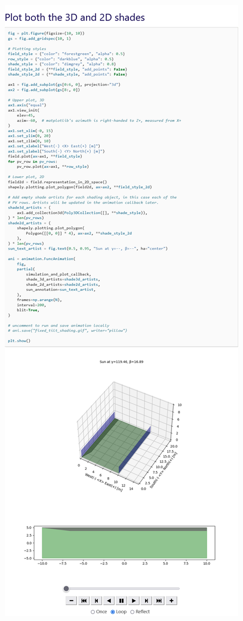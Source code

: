\begin{myparindent}{0pt}
\includegraphics[width=\linewidth,height=0.9\textheight,keepaspectratio]{images/docs_examples_cut/shading_anim_2.png}


\end{myparindent}
